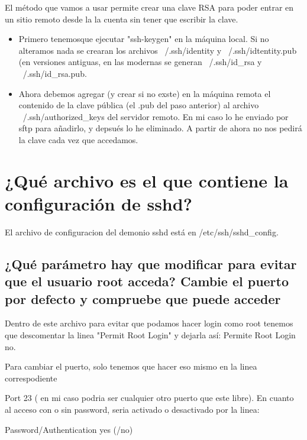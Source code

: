 El método que vamos a usar permite crear una clave RSA para poder entrar en un sitio remoto desde la la cuenta sin tener que escribir la clave.

\begin{itemize}
\item Primero tenemosque ejecutar "ssh-keygen" en la máquina local. Si no alteramos nada se crearan los archivos ~/.ssh/identity y ~/.ssh/idtentity.pub (en versiones antiguas, en las modernas se generan ~/.ssh/id\_rsa y ~/.ssh/id\_rsa.pub.

\item Ahora debemos agregar (y crear si no exste) en la máquina remota el contenido de la clave pública (el .pub del paso anterior) al archivo ~/.ssh/authorized\_keys  del servidor remoto. En mi caso lo he enviado por sftp para añadirlo, y depsués lo he eliminado. A partir de ahora no nos pedirá la clave cada vez que accedamos.
\end{itemize}


\cite{E1}



\section{ ¿Qué archivo es el que contiene la configuración de sshd? }

El archivo de configuracion del demonio sshd está en /etc/ssh/sshd\_config.

\subsection{¿Qué parámetro hay que modificar para evitar que el usuario root acceda? Cambie el puerto por defecto y compruebe que puede acceder}
Dentro de este archivo para evitar que podamos hacer login como root tenemos que descomentar la linea "Permit Root Login" y dejarla así:
Permite Root Login no.

Para cambiar el puerto, solo tenemos que hacer eso mismo en la linea correspodiente 

Port 23 ( en mi caso podria ser cualquier otro puerto que este libre).
En cuanto al acceso con o sin password, seria activado o desactivado por la linea:

Password/Authentication yes (/no)


\cite{E11}

\newpage


